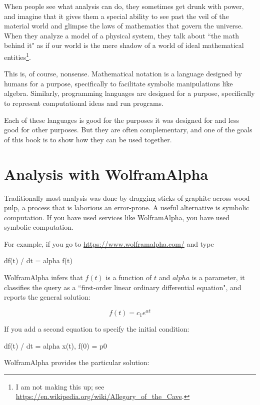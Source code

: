 \documentclass[12pt]{book}
\theoremstyle{exercise}
\begin{document}
When people see what analysis can do, they sometimes get drunk with power, and imagine that it gives them a special ability to see past the veil of the material world and glimpse the laws of mathematics that govern the universe.  When they analyze a model of a physical system, they talk about ``the math behind it" as if our world is the mere shadow of a world of ideal mathematical entities\footnote{I am not making this up; see \url{https://en.wikipedia.org/wiki/Allegory_of_the_Cave}.}.

This is, of course, nonsense.  Mathematical notation is a language designed by humans for a purpose, specifically to facilitate symbolic manipulations like algebra.  Similarly, programming languages are designed  for a purpose, specifically to represent computational ideas and run programs.

Each of these languages is good for the purposes it was designed for and less good for other purposes.  But they are often complementary, and one of the goals of this book is to show how they can be used together.


\section{Analysis with WolframAlpha}

Traditionally most analysis was done by dragging sticks of graphite across wood pulp, a process that is laborious an error-prone.  A useful alternative is symbolic computation.  If you have used services like WolframAlpha, you have used symbolic computation.

For example, if you go to \url{https://www.wolframalpha.com/} and type

\begin{python}
df(t) / dt = alpha f(t)
\end{python}

WolframAlpha infers that $f(t)$ is a function of $t$ and $alpha$ is a parameter, it classifies the query as a ``first-order linear ordinary differential equation", and reports the general solution:

\[ f(t) = c_1 e^{\alpha t} \]

If you add a second equation to specify the initial condition:

\begin{python}
df(t) / dt = alpha x(t),  f(0) = p0
\end{python}

WolframAlpha provides the particular solution:
\end{document}
